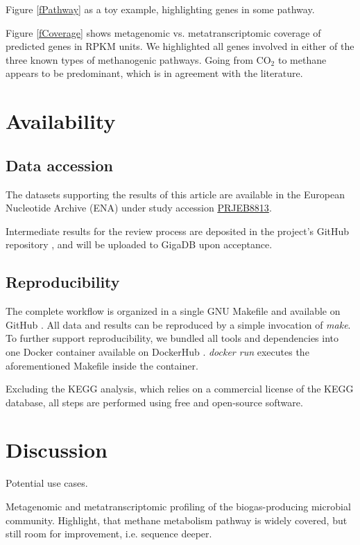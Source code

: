 \documentclass{bmcart}
\begin{document}
Figure \ref{fPathway} as a toy example, highlighting genes in some pathway.

Figure \ref{fCoverage} shows metagenomic vs. metatranscriptomic coverage of predicted genes in RPKM units. We highlighted all genes involved in either of the three known types of methanogenic pathways. Going from CO$_{\text{2}}$ to methane appears to be predominant, which is in agreement with the literature.

\section*{Availability}
\subsection*{Data accession}
The datasets supporting the results of this article are available in the European Nucleotide Archive (ENA) under study accession \href{http://www.ebi.ac.uk/ena/data/view/PRJEB8813}{PRJEB8813}.

Intermediate results for the review process are deposited in the project's GitHub repository \cite{GitHub}, and will be uploaded to GigaDB \cite{GigaDB} upon acceptance.

\subsection*{Reproducibility}
The complete workflow is organized in a single GNU Makefile and available on GitHub \cite{GitHub}.
All data and results can be reproduced by a simple invocation of \emph{make}.
To further support reproducibility, we bundled all tools and dependencies into one Docker container available on DockerHub \cite{DockerHub}. \emph{docker run} executes the aforementioned Makefile inside the container.

Excluding the KEGG analysis, which relies on a commercial license of the KEGG database, all steps are performed using free and open-source software.

\section*{Discussion}
Potential use cases.

Metagenomic and metatranscriptomic profiling of the biogas-producing microbial community.
Highlight, that methane metabolism pathway is widely covered, but still room for improvement, i.e. sequence deeper.
\end{document}
